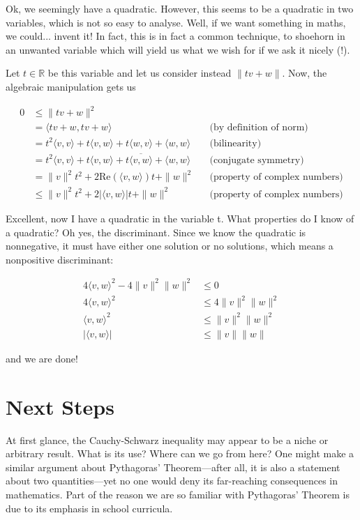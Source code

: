 \documentclass{article}
\begin{document}
Ok, we seemingly have a quadratic. However, this seems to be a quadratic in two variables, which is not so easy to analyse. Well, if we want something in maths, we could... invent it! In fact, this is in fact a common technique, to shoehorn in an unwanted variable which will yield us what we wish for if we ask it nicely (!).

Let $t \in \mathbb{R}$ be this variable and let us consider instead $\|tv+w\|$. Now, the algebraic manipulation gets us

\begin{align*}
0 &\leq \| t v + w \|^2 \\
  &= \langle t v + w, t v + w \rangle
    && \text{(by definition of norm)} \\
  &= t^2 \langle v, v \rangle + t \langle v, w \rangle + t \langle w, v \rangle + \langle w, w \rangle
    && \text{(bilinearity)} \\
  &= t^2 \langle v, v \rangle + t \langle v, w \rangle + t \overline{\langle v, w \rangle} + \langle w, w \rangle
    && \text{(conjugate symmetry)} \\
  &= \|v\|^2 t^2 + 2 \mathrm{Re}(\langle v, w \rangle) t + \|w\|^2
    && \text{(property of complex numbers)} \\
  &\leq \|v\|^2 t^2 + 2 |\langle v, w \rangle| t + \|w\|^2
    && \text{(property of complex numbers)}
\end{align*}

Excellent, now I have a quadratic in the variable t. What properties do I know of a quadratic? Oh yes, the discriminant. Since we know the quadratic is nonnegative, it must have either one solution or no solutions, which means a nonpositive discriminant:

\begin{align*}
    4\langle v, w \rangle^2 - 4\|v\|^2 \|w\|^2 &\leq 0 \\
    4\langle v, w \rangle^2 &\leq 4\|v\|^2 \|w\|^2 \\
    \langle v, w \rangle^2 &\leq \|v\|^2 \|w\|^2 \\
    |\langle v, w \rangle| &\leq \|v\| \|w\|
\end{align*}

and we are done!

\section*{Next Steps}

At first glance, the Cauchy-Schwarz inequality may appear to be a niche or arbitrary result. What is its use? Where can we go from here? One might make a similar argument about Pythagoras' Theorem—after all, it is also a statement about two quantities—yet no one would deny its far-reaching consequences in mathematics. Part of the reason we are so familiar with Pythagoras' Theorem is due to its emphasis in school curricula.
\end{document}
